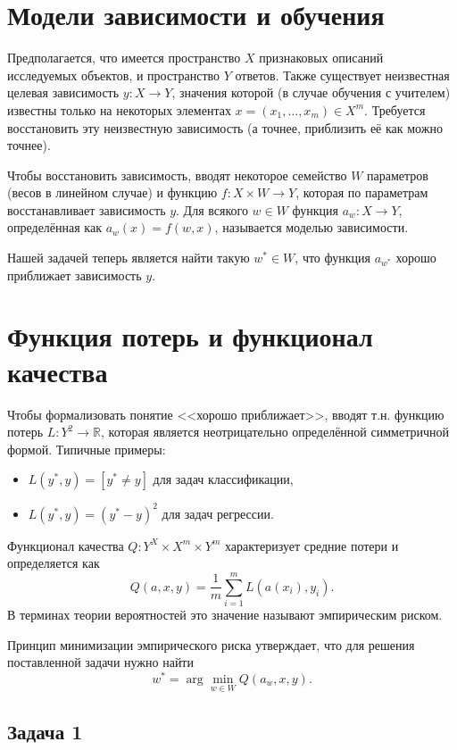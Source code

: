 \section{Модели зависимости и обучения}

Предполагается, что имеется пространство $X$ признаковых описаний исследуемых объектов, и пространство $Y$ ответов.
Также существует неизвестная целевая зависимость $y\colon X\to Y$, значения которой (в случае обучения с учителем) известны только на некоторых элементах $x = (x_1, \ldots, x_m) \in X^m$.
Требуется восстановить эту неизвестную зависимость (а точнее, приблизить её как можно точнее).

Чтобы восстановить зависимость, вводят некоторое семейство $W$ параметров (весов в линейном случае) и функцию \( f\colon X\times W\to Y\), которая по параметрам восстанавливает зависимость $y$.
Для всякого \( w\in W\) функция \( a_w\colon X\to Y\), определённая как \( a_w(x) = f(w, x)\), называется моделью зависимости.

Нашей задачей теперь является найти такую $w^* \in W$, что функция \( a_{w^*}\) хорошо приближает зависимость $y$.

\section{Функция потерь и функционал качества}

Чтобы формализовать понятие <<хорошо приближает>>, вводят т.н. функцию потерь \( L\colon Y^2\to \mathbb{R} \), которая является неотрицательно определённой симметричной формой. Типичные примеры:
\begin{itemize}
    \item \(L(y^*, y) = [y^*\neq y]\) для задач классификации,

    \item \(L(y^*, y) = (y^* - y)^2\) для задач регрессии.
\end{itemize}

Функционал качества \( Q \colon Y^X \times X^m \times Y^m\) характеризует средние потери и определяется как
\[
    Q(a, x, y) = \frac{1}{m} \sum_{i=1}^m L(a(x_i), y_i).
\]
В терминах теории вероятностей это значение называют эмпирическим риском.

Принцип минимизации эмпирического риска утверждает, что для решения поставленной задачи нужно найти
\[
    w^* = \arg\min_{w\in W} Q(a_w, x, y).
\]

\subsection*{Задача 1}

